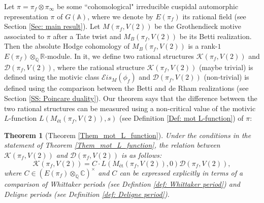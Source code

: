 \documentclass[11pt, a4paper]{amsart}
\theoremstyle{plain}
\newtheorem{theorem}{Theorem}[section]
\theoremstyle{definition}
\numberwithin{equation}{section}
\def\AAA{\mathbb{A}}
\def\CC{\mathbb{C}}
\def\QQ{\mathbb{Q}}
\def\RR{\mathbb{R}}
\begin{document}
Let $\pi = \pi_f \otimes \pi_{\infty}$ be some ``cohomological" irreducible cuspidal automorphic representation $\pi$ of $G(\AAA)$, where we denote by $E(\pi_f)$ its rational field (see Section \ref{Sec: main result}). 
Let $M(\pi_f, V(2))$ be the Grothendieck motive associated to $\pi$ \cite[Theorem 5.6]{Wild_15} after a Tate twist and $M_{B}(\pi_f, V(2))$ be its Betti realization. Then the absolute Hodge cohomology of $M_{B}(\pi_f, V(2))$ is a rank-$1$ $E(\pi_f) \otimes_{\QQ} \RR$-module. In it, we define two rational structures $\mathcal{K}(\pi_f, V(2))$ and $\mathcal{D}(\pi_f, V(2))$, where the rational structure $\mathcal{K}(\pi_f, V(2))$ (maybe trivial) is defined using the motivic class $\mathcal{E}is_{M}(\phi_f)$ and $\mathcal{D}(\pi_f, V(2))$ (non-trivial) is defined using the comparison between the Betti and de Rham realizations (see Section \ref{SS: Poincare duality}). Our theorem says that the difference between the two rational structures can be measured using a non-critical value of the motivic $L$-function $L(M_{\text{\'et}}(\pi_f, V(2)), s)$ (see Definition \ref{Def: mot L-function}) of $\pi$: 
\begin{theorem}[Theorem \ref{Them_mot_L_function}]
\label{Thm:intro_mot_L_value}
    Under the conditions in the statement of Theorem \ref{Them_mot_L_function}, 
    the relation between $\mathcal{K}(\pi_f,V(2))$ and $\mathcal{D}(\pi_f,V(2))$ is as follows: 
    \begin{equation*}
            \mathcal{K}(\pi_f,V(2)) = C \cdot L(M_{\text{\'et}}(\pi_f, V(2)), 0)\mathcal{D}(\pi_f, V(2)), 
    \end{equation*}
    where $C \in (E(\pi_f) \otimes_{\QQ} \CC)^{\times}$ and $C$ can be expressed explicitly in terms of a comparison of Whittaker periods (see Defintion \ref{def: Whittaker period}) and Deligne periods (see Definition \ref{def: Deligne period}).
\end{theorem}
\end{document}
